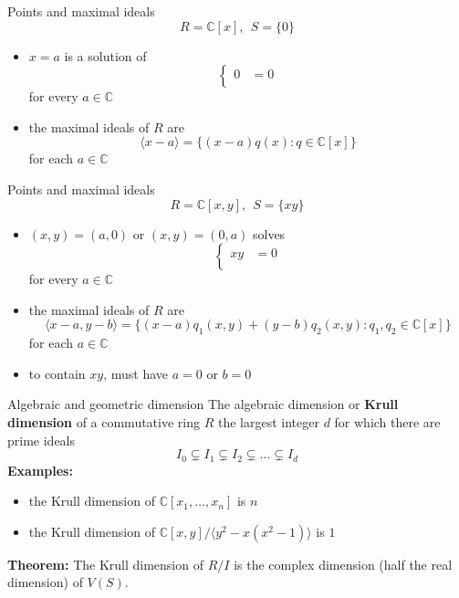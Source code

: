 \documentclass{beamer}
\begin{document}
\begin{frame}{Points and maximal ideals}
$$R = \mathbb C[x],\ \ S = \{0\}$$
\begin{itemize}
\pause
\item $x=a$ is a solution of
$$\left\lbrace
\begin{array}{cc}
0 &= 0\\
\end{array}
\right.$$
for every $a\in\mathbb{C}$
\pause
\item the maximal ideals of $R$ are
$$\langle x-a\rangle = \{(x-a)q(x): q\in \mathbb C[x]\}$$
for each $a\in \mathbb{C}$
\end{itemize}
\end{frame}

\begin{frame}{Points and maximal ideals}
$$R = \mathbb C[x,y],\ \ S = \{xy\}$$
\begin{itemize}
\pause
\item  $(x,y)=(a,0)$ or $(x,y) = (0,a)$ solves
$$\left\lbrace
\begin{array}{cc}
xy &= 0\\
\end{array}
\right.$$
for every $a\in\mathbb{C}$
\pause
\item the maximal ideals of $R$ are
$$\langle x-a,y-b\rangle = \{(x-a)q_1(x,y) + (y-b)q_2(x,y): q_1,q_2\in \mathbb C[x]\}$$
for each $a\in \mathbb{C}$
\item to contain $xy$, must have $a=0$ or $b=0$
\end{itemize}
\end{frame}

\begin{frame}{Algebraic and geometric dimension}
The algebraic dimension or \textbf{Krull dimension} of a commutative ring $R$ the largest integer $d$ for which there are prime ideals 
$$I_0\subsetneq I_1\subsetneq I_2\subsetneq \dots\subsetneq I_d$$
\textbf{Examples:}
\begin{itemize}
\pause
\item the Krull dimension of $\mathbb C[x_1,\dots, x_n]$ is $n$
\pause
\item the Krull dimension of $\mathbb C[x,y]/\langle y^2-x(x^2-1)\rangle$ is $1$
\end{itemize}
\pause
\textbf{Theorem:}
The Krull dimension of $R/I$ is the complex dimension (half the real dimension) of $V(S)$.
\end{frame}
\end{document}
